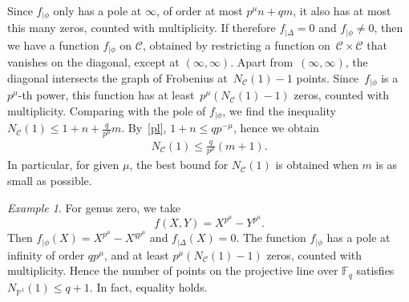 \documentclass{amsart}
\renewcommand\P{\mathbb{P}}
\newcommand\F{\mathbb{F}}
\newcommand\Curve{\mathcal{C}}
\theoremstyle{definition}\newtheorem{definition}[theorem]{Definition}
\theoremstyle{remark}\newtheorem{remark}[theorem]{Remark}
\newtheorem{example}[theorem]{Example}\newtheorem{exercise}[theorem]{Exercise}
\numberwithin{equation}{section}
\begin{document}
Since $f_{|\phi}$ only has a pole at $\infty$,
 of order at most $p^\mu n+qm$,
it also has at most this many zeros,
counted with multiplicity.
If therefore $f_{|\Delta}=0$ and $f_{|\phi}\neq0$,
then we have a function $f_{|\phi}$ on $\Curve$,
obtained by restricting a function on~\mbox{$\Curve\times\Curve$} that vanishes on the diagonal,
except at $(\infty,\infty)$.
Apart from~$(\infty,\infty)$,
the diagonal intersects the graph of Frobenius at~$N_\Curve(1)-1$ points.
Since~$f_{|\phi}$ is a $p^\mu$-th power,
this function has at least~\mbox{$p^\mu(N_\Curve(1)-1)$} zeros,
counted with multiplicity.
Comparing with the pole of $f_{|\phi}$,
 we find the inequality~\mbox{$N_\Curve(1)\leq1+n+\frac q{p^\mu}m$}.
By~\eqref{pl},
$1+n\leq qp^{-\mu}$,
hence we obtain
\begin{gather}\label{E: N1m}
N_\Curve(1)\leq\frac q{p^\mu}(m+1).
\end{gather}
In particular,
 for given $\mu$,
the best bound for $N_\Curve(1)$ is obtained when $m$ is as small as possible.

\begin{example}
For genus zero,
we take
$$
f(X,Y)=X^{p^\mu}-Y^{p^\mu}.
$$
Then $f_{|\phi}(X)=X^{p^\mu}-X^{qp^\mu}$ and $f_{|\Delta}(X)=0$.
The function $f_{|\phi}$ has a pole at infinity of order $qp^\mu$,
and at least $p^\mu(N_\Curve(1)-1)$ zeros,
counted with multiplicity.
Hence the number of points on the projective line over $\F_q$ satisfies $N_{\P^1}(1)\leq q+1$.
In fact,
equality holds.
\end{example}
\end{document}
